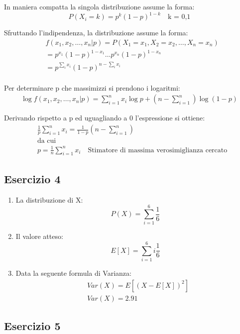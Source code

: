 \documentclass[12pt]{article}
\begin{document}
In maniera compatta la singola distribuzione assume la forma:
\[
P(X_i = k) = p^k(1-p)^{1-k} \quad \text{k = 0,1}    
\]

Sfruttando l'indipendenza, la distribuzione assume la forma:
\begin{align*}
    &f(x_1,x_2,\dots, x_n | p) = P(X_1 = x_1, X_2 = x_2, \dots, X_n = x_n) \\
    &= p^{x_1}(1-p)^{1-x_1}\dots p^{x_n}(1-p)^{1-x_n} \\
    &= p^{\sum_{i}x_i}(1-p)^{n-\sum_{i}x_i}\\
\end{align*}

Per determinare p che massimizzi si prendono i logaritmi:
\begin{align*}
    \log f(x_1,x_2,\dots, x_n | p) = \sum_{i = 1}^{n}x_i \log p + \left(n-\sum_{i=1}^{n}\right) \log(1-p)
\end{align*}

Derivando rispetto a p ed uguagliando a 0 l'espressione si ottiene:
\begin{align*}
    &\frac{1}{p}\sum_{i = 1}^{n}x_i = \frac{1}{1-p}\left(n-\sum_{i=1}^{n}\right) \\
    &\text{da cui} \\
    &p = \frac{1}{n}\sum_{i=1}^{n}x_i \quad \text{Stimatore di massima verosimiglianza cercato}
\end{align*}

\subsection*{Esercizio 4}
\begin{enumerate}
    \item La distribuzione di X:
    \[
    P(X) = \sum_{i=1}^6 \frac{1}{6}   
    \]
    \item Il valore atteso:
    \[
    E[X] = \sum_{i = 1}^6 i\frac{1}{6}   
    \]
    \item Data la seguente formula di Varianza:
    \begin{align*}
        &Var(X) = E[(X-E[X])^2] \\
        &Var(X) = 2.91
    \end{align*}
\end{enumerate}
\subsection*{Esercizio 5}
\end{document}

